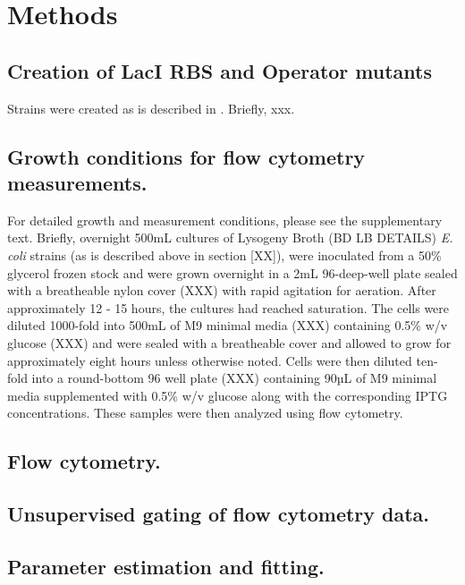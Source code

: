 \pagebreak
\section*{Methods }

\subsection{Creation of LacI RBS and Operator mutants}
Strains were created as is described in \citep{Garcia2011}. Briefly, xxx.

\subsection{Growth conditions for flow cytometry measurements.}
For detailed growth and measurement conditions, please see the supplementary text. Briefly, overnight 500mL cultures of Lysogeny Broth (BD LB DETAILS)   \textit{E. coli} strains (as is described above in section [XX]), were inoculated from a 50\% glycerol frozen stock and were grown overnight in a 2mL 96-deep-well plate sealed with a breatheable nylon cover (XXX) with rapid agitation for aeration. After approximately 12 - 15 hours, the cultures had reached saturation. The cells were diluted 1000-fold into 500mL of M9 minimal media (XXX) containing 0.5\% w/v glucose (XXX) and were sealed with a breatheable cover and allowed to grow for approximately eight hours unless otherwise noted. Cells were then diluted ten-fold into a round-bottom 96 well plate (XXX) containing 90µL of M9 minimal media supplemented with 0.5\% w/v glucose along with the corresponding IPTG concentrations. These samples were then analyzed using flow cytometry. 

\subsection{Flow cytometry.}

\subsection{Unsupervised gating of flow cytometry data.}

\subsection{Parameter estimation and fitting.}

